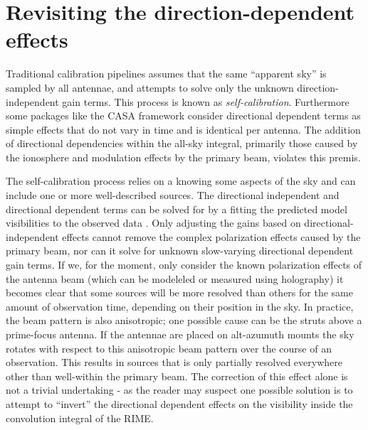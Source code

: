 \section{Revisiting the direction-dependent effects}
Traditional calibration pipelines assumes that the same ``apparent sky'' is sampled by all antennae, and attempts to solve only the unknown direction-independent gain terms.
This process is known as \textit{self-calibration}. Furthermore some packages like the CASA framework consider directional dependent terms as simple effects 
that do not vary in time and is identical per antenna. The addition of directional dependencies within the all-sky integral, primarily those caused by the 
ionosphere and modulation effects by the primary beam, violates this premis. 

The self-calibration process relies on a knowing some aspects of the sky and can include one or more well-described sources. The directional
independent and directional dependent terms can be solved for by a fitting the predicted model visibilities to the observed 
data \cite{noordam2010meqtrees}. Only adjusting the gains based on directional-independent effects cannot remove the complex 
polarization effects caused by the primary beam, nor can it solve for unknown slow-varying directional dependent gain terms. If we, for 
the moment, only consider the known polarization effects of the antenna beam (which can be modeleled or measured using holography) it 
becomes clear that some sources will be more resolved than others for the same amount of observation time, 
depending on their position in the sky. In practice, the beam pattern is also anisotropic; one possible cause can be 
the struts above a prime-focus antenna. If the antennae are placed on alt-azumuth mounts the sky rotates with respect 
to this anisotropic beam pattern over the course of an observation. This results in sources that is only partially 
resolved everywhere other than well-within the primary beam. The correction of this effect alone is not a trivial undertaking - 
as the reader may suspect one possible solution is to attempt to ``invert'' the directional dependent effects on the visibility 
inside the convolution integral of the RIME.


